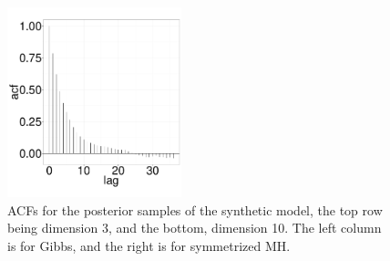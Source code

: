 {\begin{figure}[H]
\begin{minipage}[!hp]{0.99\linewidth}
\begin{minipage}[!hp]{0.99\linewidth}
    \includegraphics [width=0.45\textwidth, angle=0]{figs/EXP_ks/exp_mhacf_44_05_10_.pdf}
  \end{minipage}

  \end{minipage}
    \caption{ACFs for the posterior samples of the synthetic model, the top row being dimension 3, and the bottom, dimension 10. The left column is for Gibbs, and the right is for symmetrized MH.}
     \label{fig:ACF_EXP}
  \end{figure}

}
